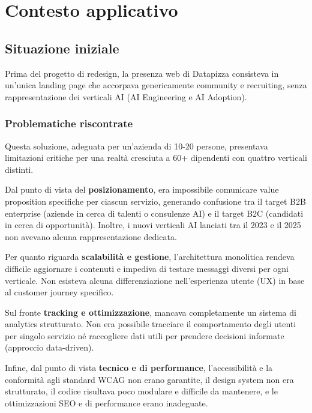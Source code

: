 \chapter{Contesto applicativo}
\sloppypar
\section{Situazione iniziale}
Prima del progetto di redesign, la presenza web di Datapizza consisteva 
in un'unica landing page che accorpava genericamente community e 
recruiting, senza rappresentazione dei verticali AI (AI Engineering e 
AI Adoption).

\subsection{Problematiche riscontrate}
Questa soluzione, adeguata per un'azienda di 10-20 persone, presentava 
limitazioni critiche per una realtà cresciuta a 60+ dipendenti con 
quattro verticali distinti.

\medskip
Dal punto di vista del \textbf{posizionamento}, era impossibile comunicare 
value proposition specifiche per ciascun servizio, generando confusione 
tra il target B2B enterprise (aziende in cerca di talenti o consulenze AI) 
e il target B2C (candidati in cerca di opportunità). Inoltre, i nuovi 
verticali AI lanciati tra il 2023 e il 2025 non avevano alcuna 
rappresentazione dedicata.

\medskip
Per quanto riguarda \textbf{scalabilità e gestione}, l'architettura 
monolitica rendeva difficile aggiornare i contenuti e impediva di testare 
messaggi diversi per ogni verticale. Non esisteva alcuna differenziazione 
nell'esperienza utente (UX) in base al customer journey specifico.

\medskip
Sul fronte \textbf{tracking e ottimizzazione}, mancava completamente un 
sistema di analytics strutturato. Non era possibile tracciare il 
comportamento degli utenti per singolo servizio né raccogliere dati utili 
per prendere decisioni informate (approccio data-driven).

\medskip
Infine, dal punto di vista \textbf{tecnico e di performance}, 
l'accessibilità e la conformità agli standard WCAG non erano garantite, 
il design system non era strutturato, il codice risultava poco modulare 
e difficile da mantenere, e le ottimizzazioni SEO e di performance erano 
inadeguate.

